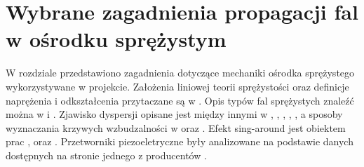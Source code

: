 \chapter{Wybrane zagadnienia propagacji fal w ośrodku sprężystym}
\label{cha:wybrane_zagadnienia_propagacji_fal_w_osrodku_sprezystym}

W rozdziale przedstawiono zagadnienia dotyczące mechaniki ośrodka sprężystego wykorzystywane w projekcie. Założenia liniowej teorii sprężystości oraz definicje naprężenia i odkształcenia przytaczane są w \cite{bartek_wolny}. Opis typów fal sprężystych znaleźć można w \cite{bartek_rose} i \cite{bartek_nazarchuk}. Zjawisko dyspersji opisane jest między innymi w \cite{bartek_rose}, \cite{bartek_feruza}, \cite{bartek_cervena}, \cite{bartek_tian}, \cite{bartek_valsamos}, a sposoby wyznaczania krzywych wzbudzalności w \cite{bartek_kijanka} oraz \cite{bartek_fabien}. Efekt sing-around jest obiektem prac \cite{bartek_crecraft}, \cite{bartek_kwach} oraz \cite{bartek_kwach2}. Przetworniki piezoeletryczne były analizowane na podstawie danych dostępnych na stronie jednego z producentów \cite{bartek_piezo}.





























